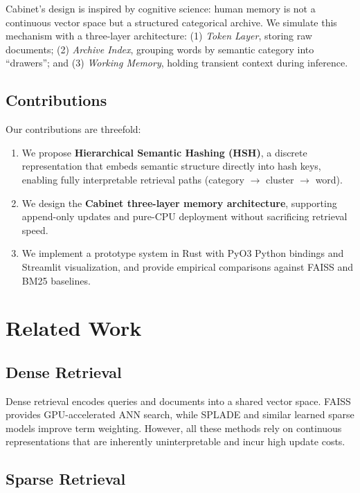 \documentclass[11pt,a4paper]{article}
\theoremstyle{definition}
\begin{document}
Cabinet's design is inspired by cognitive science: human memory is not a continuous vector space but a structured categorical archive. We simulate this mechanism with a three-layer architecture: (1) \emph{Token Layer}, storing raw documents; (2) \emph{Archive Index}, grouping words by semantic category into ``drawers''; and (3) \emph{Working Memory}, holding transient context during inference.

\subsection{Contributions}

Our contributions are threefold:
\begin{enumerate}
    \item We propose \textbf{Hierarchical Semantic Hashing (HSH)}, a discrete representation that embeds semantic structure directly into hash keys, enabling fully interpretable retrieval paths (category $\rightarrow$ cluster $\rightarrow$ word).
    \item We design the \textbf{Cabinet three-layer memory architecture}, supporting append-only updates and pure-CPU deployment without sacrificing retrieval speed.
    \item We implement a prototype system in Rust with PyO3 Python bindings and Streamlit visualization, and provide empirical comparisons against FAISS and BM25 baselines.
\end{enumerate}

\section{Related Work}
\label{sec:related}

\subsection{Dense Retrieval}

Dense retrieval encodes queries and documents into a shared vector space. FAISS \cite{johnson2019billion} provides GPU-accelerated ANN search, while SPLADE \cite{formal2021splade} and similar learned sparse models improve term weighting. However, all these methods rely on continuous representations that are inherently uninterpretable and incur high update costs.

\subsection{Sparse Retrieval}
\end{document}
